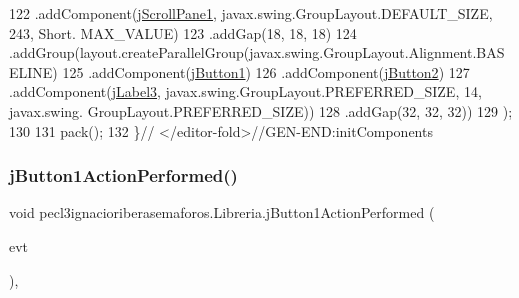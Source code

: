 \begin{DoxyCode}
122                 .addComponent(\mbox{\hyperlink{classpecl3ignacioriberasemaforos_1_1_libreria_a0b0a7cf10b835445e40913dff41cd78d}{jScrollPane1}}, javax.swing.GroupLayout.DEFAULT\_SIZE, 243, Short.
      MAX\_VALUE)
123                 .addGap(18, 18, 18)
124                 .addGroup(layout.createParallelGroup(javax.swing.GroupLayout.Alignment.BASELINE)
125                     .addComponent(\mbox{\hyperlink{classpecl3ignacioriberasemaforos_1_1_libreria_ae9afe865b26a1ef3fc5a8a9dbedfc319}{jButton1}})
126                     .addComponent(\mbox{\hyperlink{classpecl3ignacioriberasemaforos_1_1_libreria_ac544c8592612a783615a2d8e7f58e4db}{jButton2}})
127                     .addComponent(\mbox{\hyperlink{classpecl3ignacioriberasemaforos_1_1_libreria_a8e5cccc84e9e79697bd6a0e06d1f5bcc}{jLabel3}}, javax.swing.GroupLayout.PREFERRED\_SIZE, 14, javax.swing.
      GroupLayout.PREFERRED\_SIZE))
128                 .addGap(32, 32, 32))
129         );
130 
131         pack();
132     \}\textcolor{comment}{// </editor-fold>//GEN-END:initComponents}
\end{DoxyCode}
\mbox{\label{classpecl3ignacioriberasemaforos_1_1_libreria_a8a4a4d88e57496a963d12a4b9bccff9b}} 
\subsubsection{\texorpdfstring{j\+Button1\+Action\+Performed()}{jButton1ActionPerformed()}}
{\footnotesize\ttfamily void pecl3ignacioriberasemaforos.\+Libreria.\+j\+Button1\+Action\+Performed (\begin{DoxyParamCaption}\item[{java.\+awt.\+event.\+Action\+Event}]{evt }\end{DoxyParamCaption})\hspace{0.3cm}{\ttfamily [inline]}, {\ttfamily [private]}}


